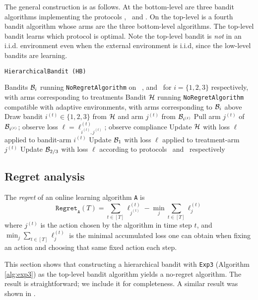 The general construction is as follows. At the bottom-level are three bandit algorithms implementing the protocols \chosen, \actual\, and \comply. On the top-level is a fourth bandit algorithm whose arms are the three bottom-level algorithms. The top-level bandit learns which protocol is optimal. 
Note the top-level bandit is \emph{not} in an i.i.d. environment even when the external environment is i.i.d, since the low-level bandits are learning.
 
\begin{algorithm}
   \caption{\texttt{HierarchicalBandit (HB)}}
   \label{alg:hier-exp}
   \begin{algorithmic}   
   	 Bandits ${\mathcal B}_i$ running \texttt{NoRegretAlgorithm} on \comply\, \chosen, and \actual\, for $i =\{1,2,3\}$ respectively, with arms corresponding to treatments
   	 Bandit ${\mathcal H}$ running \texttt{NoRegretAlgorithm} compatible with adaptive environments, with arms corresponding to ${\mathcal B}_i$ above
	   \STATE Draw bandit $i^{(t)}\in\{1,2,3\}$ from ${\mathcal H}$ and arm $j^{(t)}$ from ${\mathcal B}_{i^{(t)}}$
	   \STATE Pull arm $j^{(t)}$ of ${\mathcal B}_{i^{(t)}}$; observe loss $\ell=\ell_{i^{(t)},j^{(t)}}^{(t)}$; observe compliance
	\STATE Update ${\mathcal H}$ with loss $\ell$ applied to bandit-arm $i^{(t)}$
	\STATE Update ${\mathcal B}_1$ with loss $\ell$ applied to treatment-arm $j^{(t)}$
	\ENDIF
	\STATE Update ${\mathcal B}_{2/3}$ with loss $\ell$ according to protocols \chosen\, and \actual\, respectively
   	\ENDFOR

       	\end{algorithmic}
\end{algorithm}          

\subsection{Regret analysis}

\begin{defn}[Regret]
   The \emph{regret} of an online learning algorithm \texttt{A} is
   $$\texttt{Regret}_\texttt{A}(T) = \sum_{t\in[T]}\ell_{j^{(t)}}^{(t)}  - \min_j\sum_{t\in[T]}\ell_j^{(t)}$$
   where $j^{(t)}$ is the action chosen by the algorithm in time step $t$, and $\min_j\sum_{t\in[T]}\ell_j^{(t)}$ is the minimal accumulated loss one can obtain when fixing an action and choosing that same fixed action each step.
\end{defn}
	

This section shows that constructing a hierarchical bandit with \texttt{Exp3} (Algorithm \ref{alg:exp3}) as the top-level bandit algorithm yields a no-regret algorithm. The result is straightforward; we include it for completeness. A similar result was shown in \cite{chang:05}. 


